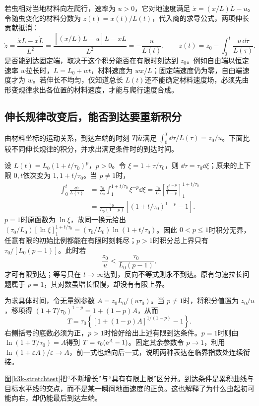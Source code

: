 若虫相对当地材料向左爬行，速率为 $u>0$，它对地速度满足 $\dot x=(x/L)\dot L-u$。令随虫变化的材料分数为 $z(t)=x(t)/L(t)$，代入商的求导公式，两项伸长贡献抵消：
\[\dot z=\frac{\dot xL-x\dot L}{L^2}
 =\frac{[(x/L)\dot L-u]L-x\dot L}{L^2}
 =-\frac{u}{L(t)},\qquad
z(t)=z_0-\int_0^t\frac{u\,\dd\tau}{L(\tau)}.\]
是否能到达固定端，取决于这个积分能否在有限时刻达到 $z_0$。例如自由端以恒定速率 $w$拉长时，$L=L_0+wt$，材料速度为 $wx/L$；固定端速度仍为零，自由端速度才为 $w$。若伸长不均匀，仅知道总长 $L(t)$还不能确定材料速度场，必须先由形变规律求出各位置的材料速度，才能与爬行速度合成。

\subsection{伸长规律改变后，能否到达要重新积分}
由材料坐标的运动关系，到达左端的时刻 $T$应满足 $\int_0^T\dd\tau/L(\tau)=z_0/u$。下面比较不同伸长规律的积分，并求出满足条件时的到达时间。

设 $L(t)=L_0(1+t/\tau_0)^p$，$p>0$。令 $\xi=1+\tau/\tau_0$，则 $\dd\tau=\tau_0\dd\xi$；原来的上下限 $0,t$依次变为 $1,1+t/\tau_0$。当 $p\ne1$时，
\begin{align*}
 \int_0^t\frac{\dd\tau}{L(\tau)}
 &=\frac{\tau_0}{L_0}\int_1^{1+t/\tau_0}\xi^{-p}\dd\xi
 =\frac{\tau_0}{L_0}\left[\frac{\xi^{1-p}}{1-p}\right]_1^{1+t/\tau_0}\\
 &=\frac{\tau_0}{L_0(1-p)}\left[(1+t/\tau_0)^{1-p}-1\right].
\end{align*}
$p=1$时原函数为 $\ln\xi$，故同一换元给出 $(\tau_0/L_0)[\ln\xi]_1^{1+t/\tau_0}=(\tau_0/L_0)\ln(1+t/\tau_0)$。因此 $0<p\le1$时积分无界，任意有限的初始比例都能在有限时刻耗尽；$p>1$时积分总上界只有 $\tau_0/[L_0(p-1)]$。此时若
\[\frac{z_0}{u}<\frac{\tau_0}{L_0(p-1)},\]
才可有限到达；等号只在 $t\to\infty$达到，反向不等式则永不到达。原有匀速拉长问题属于 $p=1$，其对数虽增长很慢，却没有有限上界。

为求具体时间，令无量纲参数 $A=z_0L_0/(u\tau_0)$。当 $p\ne1$时，将积分值置为 $z_0/u$，移项得 $(1+T/\tau_0)^{1-p}=1+(1-p)A$，从而
\[
 T=\tau_0\left\{[1+(1-p)A]^{1/(1-p)}-1\right\}.
\]
右侧括号的底数必须为正，$p>1$时恰好给出上述有限到达条件。$p=1$时则由 $\ln(1+T/\tau_0)=A$得到 $T=\tau_0(\mathrm e^A-1)$。固定其余参数令 $p\to1$，利用 $\ln(1+\varepsilon A)/\varepsilon\to A$，前一式也趋向后一式，说明两种表达在临界指数处连续衔接。

图\ref{k3k-stretchtest}把“不断增长”与“具有有限上限”区分开。到达条件是累积曲线与目标水平线的交点，而不是某一瞬间地面速度的正负。这也解释了为什么虫起初可能向右，却仍能最后到达左端。

